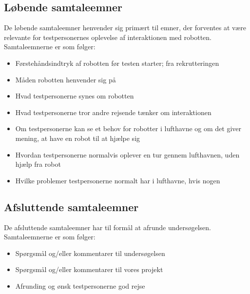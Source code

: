 \subsection{Løbende samtaleemner} 
\label{ParametreLoebendeSamtaleemner}
%
De løbende samtaleemner henvender sig primært til emner, der forventes at være relevante for testpersonernes oplevelse af interaktionen med robotten. Samtaleemnerne er som følger:\blankline
%
\begin{itemize}
\item Førstehåndsindtryk af robotten før testen starter; fra rekrutteringen
\item Måden robotten henvender sig på
\item Hvad testpersonerne synes om robotten
\item Hvad testpersonerne tror andre rejsende tænker om interaktionen 
\item Om testpersonerne kan se et behov for robotter i lufthavne og om det giver mening, at have en robot til at hjælpe sig
\item Hvordan testpersonerne normalvis oplever en tur gennem lufthavnen, uden hjælp fra robot
\item Hvilke problemer testpersonerne normalt har i lufthavne, hvis nogen 
\end{itemize}
%
\subsection{Afsluttende samtaleemner} 
\label{ParametreAfsluttendeSamtaleemner}
%
De afsluttende samtaleemner har til formål at afrunde undersøgelsen. Samtaleemnerne er som følger: \blankline
%
\begin{itemize}
\item Spørgsmål og/eller kommentarer til undersøgelsen 
\item Spørgsmål og/eller kommentarer til vores projekt
\item Afrunding og ønsk testpersonerne god rejse
\end{itemize}

